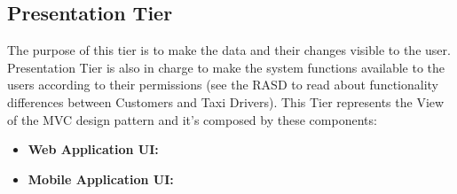 \documentclass[../../../../../../dd.tex]{subfiles}
\begin{document}
	\subsection{Presentation Tier}
		The purpose of this tier is to make the data and their changes visible to the user. Presentation Tier is also in charge to make the system functions available to the users according to their permissions (see the RASD to read about functionality differences between Customers and Taxi Drivers).
		This Tier represents the View of the MVC design pattern and it's composed by these components:
		\begin{itemize}
			\item \textbf{Web Application UI:}
			\item \textbf{Mobile Application UI:}
		\end{itemize}
	
\end{document}
